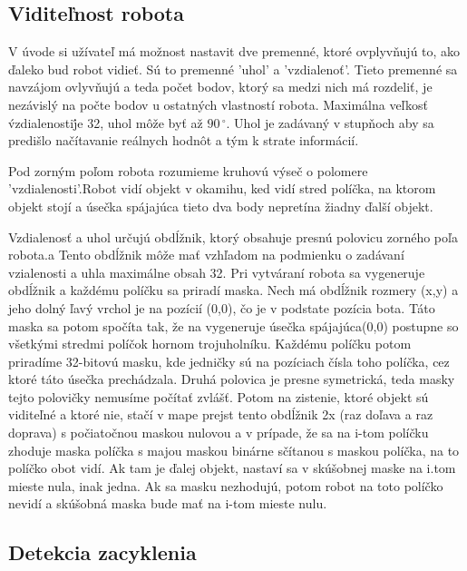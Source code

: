 \subsection{Viditeľnost robota}
V úvode si užívateľ má možnost nastavit dve premenné, ktoré ovplyvňujú to, ako ďaleko bud robot vidieť. Sú to premenné  'uhol' a 'vzdialenoť'. Tieto premenné sa navzájom ovlyvňujú a teda počet bodov, ktorý sa medzi nich má rozdeliť, je nezávislý na počte bodov u ostatných vlastností robota. Maximálna veľkosť \'vzdialenosti\' je 32, uhol môže byť až $90\,^{\circ}$. Uhol je zadávaný v stupňoch aby sa predišlo načítavanie reálnych hodnôt a tým k strate informácií.
\begin{definicia}
Pod zorným poľom robota rozumieme kruhovú výseč o polomere 'vzdialenosti'.Robot vidí objekt v okamihu, ked vidí stred políčka, na ktorom objekt stojí a úsečka spájajúca tieto dva body nepretína žiadny ďalší objekt.
\end{definicia}
Vzdialenosť a uhol určujú obdĺžnik, ktorý obsahuje presnú polovicu zorného poľa robota.a Tento obdĺžnik môže mať vzhľadom na podmienku o zadávaní vzialenosti a uhla maximálne obsah 32. Pri vytváraní robota sa vygeneruje obdĺžnik a každému políčku sa priradí maska. Nech má obdĺžnik rozmery (x,y) a jeho dolný ľavý vrchol je na pozícií (0,0), čo je v podstate pozícia bota. Táto maska sa potom spočíta tak, že na vygeneruje úsečka spájajúca(0,0) postupne so všetkými stredmi políčok hornom trojuholníku. Každému políčku potom priradíme 32-bitovú masku, kde jedničky sú na pozíciach čísla toho políčka, cez ktoré táto úsečka prechádzala. Druhá polovica je presne symetrická, teda masky tejto polovičky nemusíme počítať zvlášť. Potom na zistenie, ktoré objekt sú viditeľné a ktoré nie, stačí v mape prejst tento obdĺžnik 2x (raz doľava a raz doprava) s počiatočnou maskou nulovou a v prípade, že sa na i-tom políčku zhoduje maska políčka s majou maskou binárne sčítanou s maskou políčka, na to políčko obot vidí. Ak tam je ďalej objekt, nastaví sa v skúšobnej maske na i.tom mieste nula, inak jedna. Ak sa masku nezhodujú, potom robot na toto políčko nevidí a skúšobná maska bude mať na i-tom mieste nulu.
\indent

\subsection{Detekcia zacyklenia}


